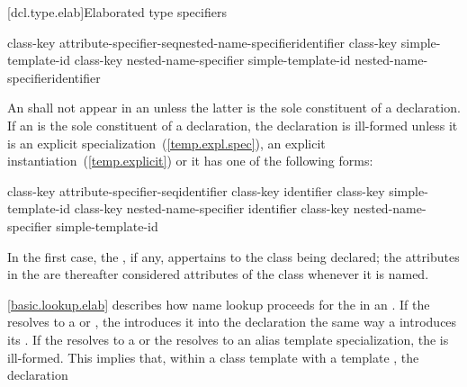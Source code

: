 [dcl.type.elab]{Elaborated type specifiers}%
%
%

\begin{bnf}
\br
    class-key attribute-specifier-seq\opt nested-name-specifier\opt identifier\br
    class-key simple-template-id\br
    class-key nested-name-specifier \opt simple-template-id\br
     nested-name-specifier\opt identifier
\end{bnf}

\pnum
{}%
%
An  shall not appear in an 
unless the latter is the sole constituent of a declaration.
If an  is the sole constituent of a
declaration, the declaration is ill-formed unless it is an explicit
specialization~(\ref{temp.expl.spec}), an explicit
instantiation~(\ref{temp.explicit}) or it has one of the following
forms:

\begin{ncsimplebnf}
class-key attribute-specifier-seq\opt identifier \terminal{;}\br
{} class-key \terminal{::\opt} identifier \terminal{;}\br
{} class-key \terminal{::\opt} simple-template-id \terminal{;}\br
{} class-key nested-name-specifier identifier \terminal{;}\br
{} class-key nested-name-specifier  simple-template-id \terminal{;}
\end{ncsimplebnf}

In the first case, the , if any, appertains
to the class being declared; the attributes in the
 are thereafter considered attributes of
the class whenever it is named.

\pnum
\ref{basic.lookup.elab} describes how name lookup proceeds for the
 in an . If the
 resolves to a  or
, the 
introduces it into the declaration the same way a
 introduces its . If
the  resolves to a
 or the  resolves to
an alias template specialization,
the
 is ill-formed.
\enternote
This implies that, within a class template with a template
 , the declaration

